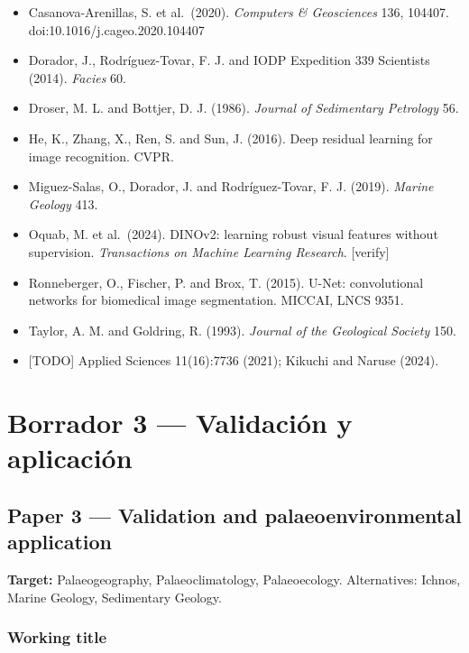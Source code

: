 \documentclass[
  10pt,
]{article}
\providecommand{\tightlist}{%
  \setlength{\itemsep}{0pt}\setlength{\parskip}{0pt}}
\begin{document}
\begin{itemize}
\tightlist
\item
  Casanova-Arenillas, S. et al.~(2020). \emph{Computers \& Geosciences}
  136, 104407. doi:10.1016/j.cageo.2020.104407
\item
  Dorador, J., Rodríguez-Tovar, F. J. and IODP Expedition 339 Scientists
  (2014). \emph{Facies} 60.
\item
  Droser, M. L. and Bottjer, D. J. (1986). \emph{Journal of Sedimentary
  Petrology} 56.
\item
  He, K., Zhang, X., Ren, S. and Sun, J. (2016). Deep residual learning
  for image recognition. CVPR.
\item
  Miguez-Salas, O., Dorador, J. and Rodríguez-Tovar, F. J. (2019).
  \emph{Marine Geology} 413.
\item
  Oquab, M. et al.~(2024). DINOv2: learning robust visual features
  without supervision. \emph{Transactions on Machine Learning Research}.
  {[}verify{]}
\item
  Ronneberger, O., Fischer, P. and Brox, T. (2015). U-Net: convolutional
  networks for biomedical image segmentation. MICCAI, LNCS 9351.
\item
  Taylor, A. M. and Goldring, R. (1993). \emph{Journal of the Geological
  Society} 150.
\item
  {[}TODO{]} Applied Sciences 11(16):7736 (2021); Kikuchi and Naruse
  (2024).
\end{itemize}

\newpage

\hypertarget{borrador-3-validaciuxf3n-y-aplicaciuxf3n}{%
\section{Borrador 3 --- Validación y
aplicación}\label{borrador-3-validaciuxf3n-y-aplicaciuxf3n}}

\hypertarget{paper-3-validation-and-palaeoenvironmental-application}{%
\subsection{Paper 3 --- Validation and palaeoenvironmental
application}\label{paper-3-validation-and-palaeoenvironmental-application}}

\textbf{Target:} Palaeogeography, Palaeoclimatology, Palaeoecology.
Alternatives: Ichnos, Marine Geology, Sedimentary Geology.

\hypertarget{working-title-1}{%
\subsubsection{Working title}\label{working-title-1}}
\end{document}
